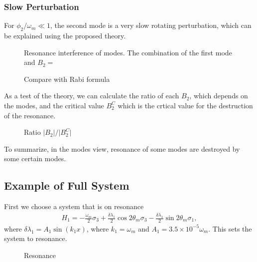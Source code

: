 \documentclass[letterpaper,12pt,english]{sphinxmanual}
\begin{document}
\subsubsection{Slow Perturbation}
\label{\detokenize{matter-stimulated/picture:slow-perturbation}}
For \(\phi_2/\omega_m \ll 1\), the second mode is a very slow rotating perturbation, which can be explained using the proposed theory.
\begin{figure}[htbp]
\centering
\capstart

\noindent{}
\caption{Resonance interference of modes. The combination of the first mode and \(B_2=\)}\label{\detokenize{matter-stimulated/picture:id1}}\end{figure}
\begin{figure}[htbp]
\centering
\capstart

\noindent{}
\caption{Compare with Rabi formula}\label{\detokenize{matter-stimulated/picture:id2}}\end{figure}

As a test of the theory, we can calculate the ratio of each \(B_2\), which depends on the modes, and the critical value \(B_2^C\) which is the crtical value for the destruction of the resonance.
\begin{figure}[htbp]
\centering
\capstart

\noindent{}
\caption{Ratio \(\lvert B_2\rvert/\lvert B_2^C \rvert\)}\label{\detokenize{matter-stimulated/picture:id3}}\end{figure}

To summarize, in the modes view, resonance of some modes are destroyed by some certain modes.


\subsection{Example of Full System}
\label{\detokenize{matter-stimulated/picture:example-of-full-system}}
First we choose a system that is on resonance
\begin{equation*}
\begin{split}H_1 = -\frac{\omega_m}{2} \sigma_3 + \frac{\delta \lambda_1}{2} \cos 2\theta_m \sigma_3 - \frac{\delta \lambda_1}{2} \sin 2\theta_m \sigma_1,\end{split}
\end{equation*}
where \(\delta\lambda_1 = A_1 \sin (k_1 x)\), where \(k_1 = \omega_m\) and \(A_1 = 3.5\times 10^{-5}\omega_m\). This sets the system to resonance.
\begin{figure}[htbp]
\centering
\capstart

\noindent{}
\caption{Resonance}\label{\detokenize{matter-stimulated/picture:id4}}\end{figure}
\end{document}

